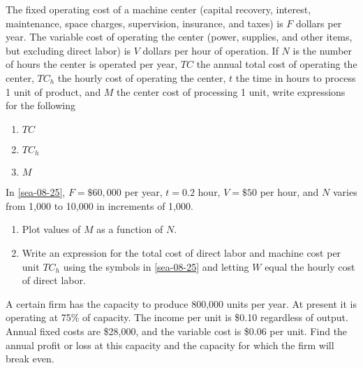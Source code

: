 \begin{exercises}
    \begin{exercise}
    \label{sea-08-25}
        The fixed operating cost of a machine center (capital recovery, interest, maintenance, space charges, supervision, insurance, and taxes) is $F$ dollars per year. The variable cost of operating the center (power, supplies, and other items, but excluding direct labor) is $V$ dollars per hour of operation. If $N$ is the number of hours the center is operated per year, $TC$ the annual total cost of operating the center, $TC_h$ the hourly cost of operating the center, $t$ the time in hours to process 1 unit of product, and $M$ the center cost of processing 1 unit, write expressions for the following
        \begin{enumerate}[label=\alph*)]
            \item $TC$
            \item $TC_h$
            \item $M$
        \end{enumerate}
    \end{exercise}
    \begin{solution}
    \end{solution}
    
    \begin{exercise}
    \label{sea-08-26}
        In \ref{sea-08-25}, $F=\$60,000$ per year, $t=0.2$ hour, $V=\$50$ per hour, and $N$ varies from 1,000 to 10,000 in increments of 1,000.
        \begin{enumerate}[label=\alph*)]
            \item Plot values of $M$ as a function of $N$.
            \item Write an expression for the total cost of direct labor and machine cost per unit $TC_h$ using the symbols in \ref{sea-08-25} and letting $W$ equal the hourly cost of direct labor.
        \end{enumerate}
    \end{exercise}
    \begin{solution}
    \end{solution}
    
    \begin{exercise}
    \label{sea-08-27}
        A certain firm has the capacity to produce 800,000 units per year. At present it is operating at 75\% of capacity. The income per unit is \$0.10 regardless of output. Annual fixed costs are \$28,000, and the variable cost is \$0.06 per unit. Find the annual profit or loss at this capacity and the capacity for which the firm will break even.
    \end{exercise}
    \begin{solution}
    \end{solution}
    

\end{exercises}
